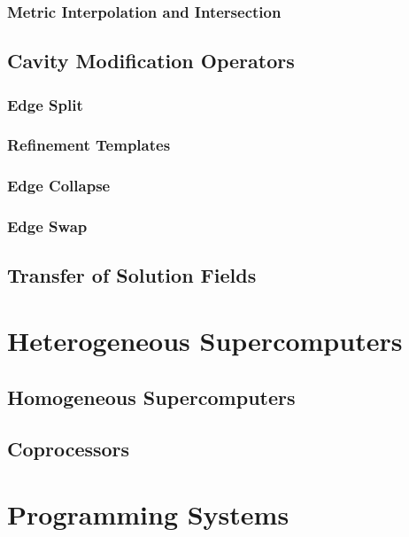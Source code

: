\subsubsection{Metric Interpolation and Intersection}

\subsection{Cavity Modification Operators}

\subsubsection{Edge Split}

\subsubsection{Refinement Templates}

\subsubsection{Edge Collapse}

\subsubsection{Edge Swap}

\subsection{Transfer of Solution Fields}

\section{Heterogeneous Supercomputers}

\subsection{Homogeneous Supercomputers}

\subsection{Coprocessors}

\section{Programming Systems}

